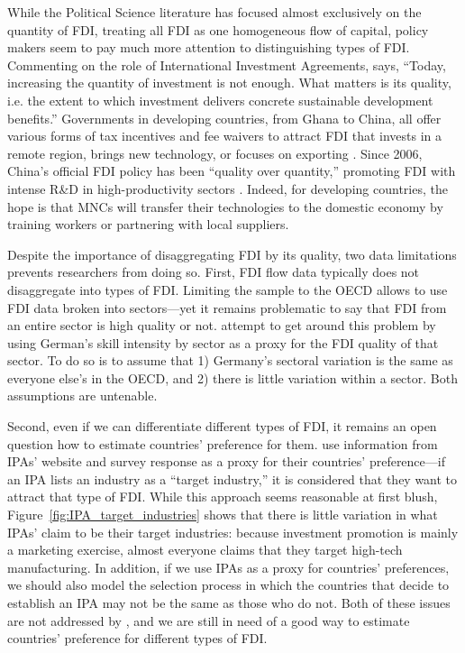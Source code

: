 While the Political Science literature has focused almost exclusively on the
quantity of FDI, treating all FDI as one homogeneous flow of capital, policy
makers seem to pay much more attention to distinguishing types of FDI.
Commenting on the role of International Investment Agreements,
\citet{UNCTAD2015} says, ``Today, increasing the quantity of investment is not
enough. What matters is its quality, i.e. the extent to which investment
delivers concrete sustainable development benefits.'' Governments in developing
countries, from Ghana to China, all offer various forms of tax incentives and
fee waivers to attract FDI that invests in a remote region, brings new
technology, or focuses on exporting \citep{Ricupero2000}. Since 2006, China's
official FDI policy has been ``quality over quantity,'' promoting FDI with
intense R\&D in high-productivity sectors \citep{Guangzhou2011}. Indeed, for
developing countries, the hope is that MNCs will transfer their technologies to
the domestic economy by training workers or partnering with local suppliers.

Despite the importance of disaggregating FDI by its quality, two data
limitations prevents researchers from doing so. First, FDI flow data typically
does not disaggregate into types of FDI. Limiting the sample to the OECD allows
\citet{Alfaro2003} to use FDI data broken into sectors---yet it remains
problematic to say that FDI from an entire sector is high quality or not.
\citet{Alfaro2007} attempt to get around this problem by using German's
skill intensity by sector as a proxy for the FDI quality of that sector. To do
so is to assume that 1) Germany's sectoral variation is the same as everyone
else's in the OECD, and 2) there is little variation within a sector. Both
assumptions are untenable.

Second, even if we can differentiate different types of FDI, it remains an open
question how to estimate countries' preference for them. \citet{Alfaro2007} use
information from IPAs' website and survey response as a proxy for their
countries' preference---if an IPA lists an industry as a ``target industry,'' it is
considered that they want to attract that type of FDI. While this approach seems
reasonable at first blush, Figure~\ref{fig:IPA_target_industries} shows that
there is little variation in what IPAs' claim to be their target industries: because investment promotion is mainly a marketing exercise, almost everyone
claims that they target high-tech manufacturing. In addition, if we use IPAs as
a proxy for countries' preferences, we should also model the selection process in
which the countries that decide to establish an IPA may not be the same as those who
do not. Both of these issues are not addressed by \citep{Alfaro2007}, and we are
still in need of a good way to estimate countries' preference for different
types of FDI. 

